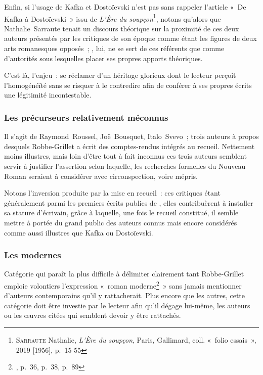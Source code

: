 Enfin, si l'usage de Kafka et Dostoïevski n'est pas sans rappeler l'article «~De Kafka à Dostoïevski~» issu de \textit{L'Ère du soupçon}\footnote{\textsc{Sarraute} Nathalie, \textit{L'Ère du soupçon}, Paris, Gallimard, coll. «~folio essais~», 2019 [1956], p.~15-55
}, notons qu'alors que Nathalie~Sarraute tenait un discours théorique sur la proximité de ces deux auteurs présentés par les critiques de son époque comme étant les figures de deux arts romanesques opposés~; \robbe, lui, ne se sert de ces référents que comme d'autorités sous lesquelles placer ses propres apports théoriques.

C'est là, l'enjeu~: se réclamer d'un héritage glorieux dont le lecteur perçoit l'homogénéïté sans se risquer à le contredire afin de conférer à ses propres écrits une légitimité incontestable.

\subsubsection{Les précurseurs relativement méconnus}
Il s'agit de Raymond~Roussel, Joë~Bousquet, Italo~Svevo~; trois auteurs à propos desquels Robbe-Grillet a écrit des comptes-rendus intégrés au recueil. Nettement moins illustres, mais loin d'être tout à fait inconnus ces trois auteurs semblent servir à justifier l'assertion selon laquelle, les recherches formelles du Nouveau Roman seraient à considérer avec circonspection, voire mépris.

Notons l'inversion produite par la mise en recueil~: ces critiques étant généralement parmi les premiers écrits publics de \robbe, elles contribuèrent à installer sa stature d'écrivain, grâce à laquelle, une fois le recueil constitué, il semble mettre à portée du grand public des auteurs connus mais encore considérés comme aussi illustres que Kafka ou Dostoïevski.




\subsubsection{Les modernes}


Catégorie qui paraît la plus difficile à délimiter clairement tant Robbe-Grillet emploie volontiers l'expression «~roman moderne\footnote{, p.~36, p.~38, p.~89}~» sans jamais mentionner d'auteurs contemporains qu'il y rattacherait. Plus encore que les autres, cette catégorie doit être investie par le lecteur afin qu'il dégage lui-même, les auteurs ou les œuvres citées qui semblent devoir y être rattachés.


